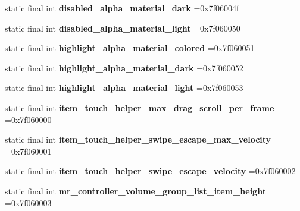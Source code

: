 \begin{DoxyCompactItemize}
static final int {\bfseries disabled\+\_\+alpha\+\_\+material\+\_\+dark} =0x7f06004f
\item 
\mbox{\label{classproject4_1_1xaria_1_1R_1_1dimen_aad801141144d1bcc94b3d983a333b1b7}} 
static final int {\bfseries disabled\+\_\+alpha\+\_\+material\+\_\+light} =0x7f060050
\item 
\mbox{\label{classproject4_1_1xaria_1_1R_1_1dimen_a25e2bc258ac362cc692aa16b54793d01}} 
static final int {\bfseries highlight\+\_\+alpha\+\_\+material\+\_\+colored} =0x7f060051
\item 
\mbox{\label{classproject4_1_1xaria_1_1R_1_1dimen_a78acd3e6196bd9f4a575f93103400ef2}} 
static final int {\bfseries highlight\+\_\+alpha\+\_\+material\+\_\+dark} =0x7f060052
\item 
\mbox{\label{classproject4_1_1xaria_1_1R_1_1dimen_a7f5381179ba0af355ab5085a38b73b04}} 
static final int {\bfseries highlight\+\_\+alpha\+\_\+material\+\_\+light} =0x7f060053
\item 
\mbox{\label{classproject4_1_1xaria_1_1R_1_1dimen_a0a945d1055288bc66e94850957c953d0}} 
static final int {\bfseries item\+\_\+touch\+\_\+helper\+\_\+max\+\_\+drag\+\_\+scroll\+\_\+per\+\_\+frame} =0x7f060000
\item 
\mbox{\label{classproject4_1_1xaria_1_1R_1_1dimen_aece10233f4ac057701d1f4fea391c673}} 
static final int {\bfseries item\+\_\+touch\+\_\+helper\+\_\+swipe\+\_\+escape\+\_\+max\+\_\+velocity} =0x7f060001
\item 
\mbox{\label{classproject4_1_1xaria_1_1R_1_1dimen_ad4dc0a290fb88cb4965d9b9ff1a8b6e2}} 
static final int {\bfseries item\+\_\+touch\+\_\+helper\+\_\+swipe\+\_\+escape\+\_\+velocity} =0x7f060002
\item 
\mbox{\label{classproject4_1_1xaria_1_1R_1_1dimen_a19a1d57bed27c55d388f65ae93f4a604}} 
static final int {\bfseries mr\+\_\+controller\+\_\+volume\+\_\+group\+\_\+list\+\_\+item\+\_\+height} =0x7f060003

\end{DoxyCompactItemize}
